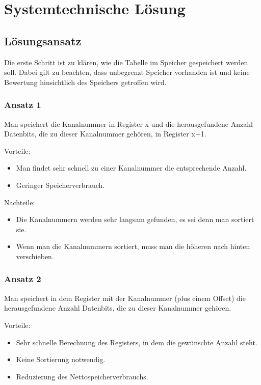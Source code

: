\chapter{Systemtechnische Lösung}
\label{chapter:Pflichtenheft-SystemtechnischeLoesung}

\section{Lösungsansatz}
\label{section:Pflichtenheft-SystemtechnischeLoesung-Loesungsansatz}

Die erste Schritt ist zu klären, wie die Tabelle im Speicher gespeichert werden soll. Dabei gilt zu beachten, dass unbegrenzt Speicher vorhanden ist und keine Bewertung hinsichtlich des Speichers getroffen wird.

\subsection{Ansatz 1}
Man speichert die Kanalnummer in Register x und die herausgefundene Anzahl Datenbits, die zu dieser Kanalnummer gehören, in Register x+1.

Vorteile:
\begin{itemize}
    \item Man findet sehr schnell zu einer Kanalnummer die entsprechende Anzahl.
    \item Geringer Speicherverbrauch.
\end{itemize}

Nachteile:
\begin{itemize}
    \item Die Kanalnummern werden sehr langsam gefunden, es sei denn man sortiert sie.
    \item Wenn man die Kanalnummern sortiert, muss man die höheren nach hinten verschieben.
\end{itemize}

\subsection{Ansatz 2}
Man speichert in dem Register mit der Kanalnummer (plus einem Offset) die herausgefundene Anzahl Datenbits, die zu dieser Kanalnummer gehören.

Vorteile:
\begin{itemize}
    \item Sehr schnelle Berechnung des Registers, in dem die gewünschte Anzahl steht.
    \item Keine Sortierung notwendig.
    \item Reduzierung des Nettospeicherverbrauchs.
\end{itemize}

